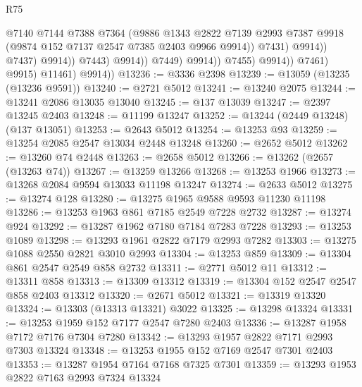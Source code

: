\begin{lexlean}{R75}
\begin{coremodule}
                                            @7140
                                            @7144
                                            @7388
                                            @7364
                                            (@9886
                                              @1343
                                              @2822
                                              @7139
                                              @2993
                                              @7387
                                              @9918
                                              (@9874 @152 @7137 @2547 @7385 @2403 @9966 @9914))
                                            @7431)
                                          @9914))
                                      @7437)
                                    @9914))
                                @7443)
                              @9914))
                          @7449)
                        @9914))
                    @7455)
                  @9914))
              @7461)
            @9915)
          @11461)
        @9914))
@13236 := @3336 @2398
@13239 := @13059 (@13235 (@13236 @9591))
@13240 := @2721 @5012
@13241 := @13240 @2075
@13244 := @13241 @2086 @13035 @13040
@13245 := @137 @13039
@13247 := @2397 @13245 @2403
@13248 := @11199 @13247
@13252 := @13244 (@2449 @13248) (@137 @13051)
@13253 := @2643 @5012
@13254 := @13253 @93
@13259 := @13254 @2085 @2547 @13034 @2448 @13248
@13260 := @2652 @5012
@13262 := @13260 @74 @2448
@13263 := @2658 @5012
@13266 := @13262 (@2657 (@13263 @74))
@13267 := @13259 @13266
@13268 := @13253 @1966
@13273 := @13268 @2084 @9594 @13033 @11198 @13247
@13274 := @2633 @5012
@13275 := @13274 @128
@13280 := @13275 @1965 @9588 @9593 @11230 @11198
@13286 := @13253 @1963 @861 @7185 @2549 @7228 @2732
@13287 := @13274 @924
@13292 := @13287 @1962 @7180 @7184 @7283 @7228
@13293 := @13253 @1089
@13298 := @13293 @1961 @2822 @7179 @2993 @7282
@13303 := @13275 @1088 @2550 @2821 @3010 @2993
@13304 := @13253 @859
@13309 := @13304 @861 @2547 @2549 @858 @2732
@13311 := @2771 @5012 @11
@13312 := @13311 @858
@13313 := @13309 @13312
@13319 := @13304 @152 @2547 @2547 @858 @2403 @13312
@13320 := @2671 @5012
@13321 := @13319 @13320
@13324 := @13303 (@13313 @13321) @3022
@13325 := @13298 @13324
@13331 := @13253 @1959 @152 @7177 @2547 @7280 @2403
@13336 := @13287 @1958 @7172 @7176 @7304 @7280
@13342 := @13293 @1957 @2822 @7171 @2993 @7303 @13324
@13348 := @13253 @1955 @152 @7169 @2547 @7301 @2403
@13353 := @13287 @1954 @7164 @7168 @7325 @7301
@13359 := @13293 @1953 @2822 @7163 @2993 @7324 @13324

\end{coremodule}
\end{lexlean}
